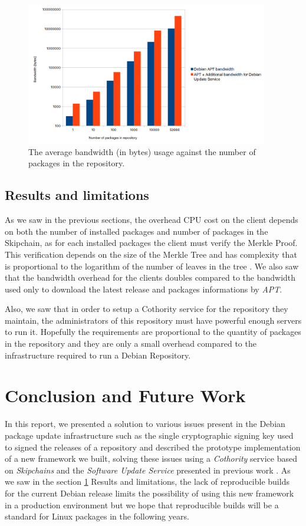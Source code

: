 \documentclass[11pt, upma4paper, twoside, openany, parskip=half]{book}
\begin{document}
\begin{figure}[H]
	\centering
	\includegraphics[width=300pt]{client_BW_measures.png}
	\caption{The average bandwidth (in bytes) usage against the number of packages in the repository.}
	\label{num_package_in_repo_bandwidth}
\end{figure}

\section{Results and limitations}\label{limit}

As we saw in the previous sections, the overhead CPU cost on the client depends on both the number of installed packages and number of packages in the Skipchain, as for each installed packages the client must verify the Merkle Proof. This verification depends on the size of the Merkle Tree and has complexity that is proportional to the logarithm of the number of leaves in the tree \cite{_merkle_????-1}. We also saw that the bandwidth overhead for the clients doubles compared to the bandwidth used only to download the latest release and packages informations by \emph{APT}. 

Also, we saw that in order to setup a Cothority service for the repository they maintain, the administrators of this repository must have powerful enough servers to run it. Hopefully the requirements are proportional to the quantity of packages in the repository and they are only a small overhead compared to the infrastructure required to run a Debian Repository.

\chapter{Conclusion and Future Work}
In this report, we presented a solution to various issues present in the Debian package update infrastructure such as the single cryptographic signing key used to signed the releases of a repository and described the prototype implementation of a new framework we built, solving these issues using a \emph{Cothority} service based on \emph{Skipchains} and the \emph{Software Update Service} presented in previous work \cite{_back_2016}. As we saw in the section \ref{limit} Results and limitations, the lack of reproducible builds for the current Debian release limits the possibility of using this new framework in a production environment but we hope that reproducible builds will be a standard for Linux packages in the following years.
\end{document}

